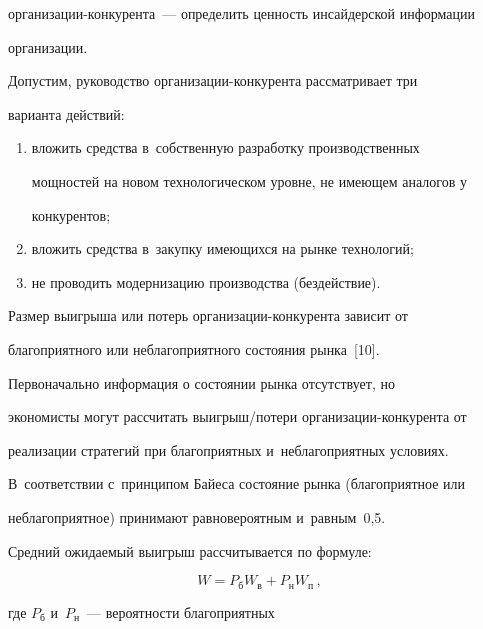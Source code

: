 ор\-га\-ни\-за\-ции-кон\-ку\-рен\-та~--- определить ценность инсайдерской информации 


организации. 


     


     Допустим, руководство организации-конкурента рассматривает три 


варианта действий:


     \begin{enumerate}[(1)]


\item вложить средства в~собственную разработку производственных 


мощностей на новом технологическом уровне, не имеющем аналогов у 


конкурентов;


\item вложить средства в~закупку имеющихся на рынке технологий;


\item не проводить модернизацию производства (бездействие). 


\end{enumerate}





     Размер выигрыша или потерь организации-конкурента зависит от 


благоприятного или неблагоприятного состояния рынка~[10].


     


     Первоначально информация о состоянии рынка отсутствует, но 


экономисты могут рассчитать выигрыш\!/\!потери организации-конкурента от 


реализации стратегий при благоприятных и~неблагоприятных условиях. 


В~соответствии с~принципом Байеса состояние рынка (благоприятное или 


неблагоприятное) принимают равновероятным и~равным~0,5.


     


     Средний ожидаемый выигрыш рассчитывается по формуле:


     $$


     W=P_{\mathrm{б}} W_{\mathrm{в}}+P_{\mathrm{н}} W_{\mathrm{п}}\,,


     $$


где $ P_{\mathrm{б}} $ и~$P_{\mathrm{н}} $~--- вероятности благоприятных 


